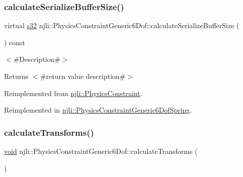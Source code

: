 \mbox{\label{classnjli_1_1_physics_constraint_generic6_dof_a386006d689e37b554d43d86d718966d8}} 
\subsubsection{\texorpdfstring{calculate\+Serialize\+Buffer\+Size()}{calculateSerializeBufferSize()}}
{\footnotesize\ttfamily virtual \mbox{\hyperlink{_util_8h_aa62c75d314a0d1f37f79c4b73b2292e2}{s32}} njli\+::\+Physics\+Constraint\+Generic6\+Dof\+::calculate\+Serialize\+Buffer\+Size (\begin{DoxyParamCaption}{ }\end{DoxyParamCaption}) const\hspace{0.3cm}{\ttfamily [virtual]}}

$<$\#\+Description\#$>$

\begin{DoxyReturn}{Returns}
$<$\#return value description\#$>$ 
\end{DoxyReturn}


Reimplemented from \mbox{\hyperlink{classnjli_1_1_physics_constraint_aeda6c35ab271897cfe3192870d4ac7a4}{njli\+::\+Physics\+Constraint}}.



Reimplemented in \mbox{\hyperlink{classnjli_1_1_physics_constraint_generic6_dof_spring_a2d22369c72fba1c3a477251c14273a2e}{njli\+::\+Physics\+Constraint\+Generic6\+Dof\+Spring}}.

\mbox{\label{classnjli_1_1_physics_constraint_generic6_dof_a120abacab53cf4dcf4b97241dc8a59b8}} 
\subsubsection{\texorpdfstring{calculate\+Transforms()}{calculateTransforms()}}
{\footnotesize\ttfamily \mbox{\hyperlink{_thread_8h_af1e856da2e658414cb2456cb6f7ebc66}{void}} njli\+::\+Physics\+Constraint\+Generic6\+Dof\+::calculate\+Transforms (\begin{DoxyParamCaption}{ }\end{DoxyParamCaption})}

